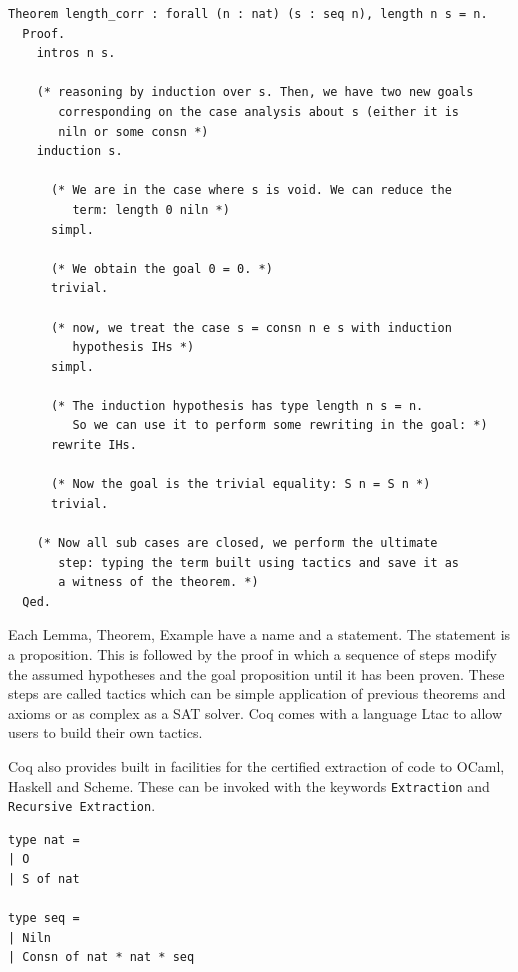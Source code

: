 \documentclass[12pt,twoside,notitlepage]{report}
\begin{document}
\begin{minipage}{\linewidth}

\begin{lstlisting}[language={Coq},caption={Coq theorem example}]
Theorem length_corr : forall (n : nat) (s : seq n), length n s = n.
  Proof.
    intros n s.

    (* reasoning by induction over s. Then, we have two new goals
       corresponding on the case analysis about s (either it is 
       niln or some consn *)
    induction s.

      (* We are in the case where s is void. We can reduce the 
         term: length 0 niln *)
      simpl. 

      (* We obtain the goal 0 = 0. *)
      trivial.

      (* now, we treat the case s = consn n e s with induction 
         hypothesis IHs *)
      simpl. 

      (* The induction hypothesis has type length n s = n. 
         So we can use it to perform some rewriting in the goal: *)
      rewrite IHs. 

      (* Now the goal is the trivial equality: S n = S n *)
      trivial.

    (* Now all sub cases are closed, we perform the ultimate
       step: typing the term built using tactics and save it as
       a witness of the theorem. *)
  Qed.	  
\end{lstlisting}

\end{minipage}
Each Lemma, Theorem, Example have a name and a statement. The statement is a proposition. This is followed by the proof in which a sequence of steps modify the assumed hypotheses and the goal proposition until it has been proven. These steps are called tactics which can be simple application of previous theorems and axioms or as complex as a SAT solver. Coq comes with a language Ltac to allow users to build their own tactics.


Coq also provides built in facilities for the certified extraction of code to OCaml, Haskell and Scheme. These can be invoked with the keywords \lstinline[language={Coq}]|Extraction| and \lstinline[language={Coq}]|Recursive Extraction|. 


\begin{minipage}{\linewidth}

\begin{lstlisting}[caption={Coq to OCaml extraction of seq}]
type nat =
| O
| S of nat

type seq =
| Niln
| Consn of nat * nat * seq
\end{lstlisting}

\end{minipage}
\end{document}
